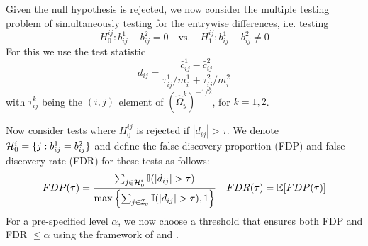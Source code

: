 \documentclass[12pt, letterpaper]{article}
\theoremstyle{definition}
\DeclareMathOperator*{\Th}{^{\text{th}}}
\numberwithin{equation}{section}
\begin{document}
Given the null hypothesis is rejected, we now consider the multiple testing problem of simultaneously testing for the entrywise differences, i.e. testing
%
$$
H_0^{ij}: b_{ij}^1 - b_{ij}^2 = 0 \quad \text{vs.} \quad H_1^{ij}: b_{ij}^1 - b_{ij}^2 \neq 0 
$$
%
For this we use the test statistic
%
$$
d_{ij} = \frac{\widehat c_{ij}^1 - \widehat c_{ij}^2}{\tau_{ij}^1/ m_i^1 + \tau_{ij}^2/ m_i^2}
$$
%
with $\tau_{ij}^k$ being the $(i,j)^{\Th}$ element of $( \widehat \Omega_y^k)^{-1/2}$, for $k = 1,2$.

Now consider tests where $H_0^{ij}$ is rejected if $| d_{ij} | > \tau$. We denote ${\cal{H}}_0^i = \{ j: b_{ij}^1 = b_{ij}^2 \}$ and define the false discovery proportion (FDP) and false discovery rate (FDR) for these tests as follows:
%
$$
FDP (\tau) = \frac{\sum_{j \in {\cal{H}}_0^i} {\mathbb{I}}( |d_{ij}| > \tau)}{\max\left\{
\sum_{j \in {\cal{I}}_q} {\mathbb{I}}( |d_{ij}| > \tau), 1\right\} }\quad
FDR (\tau) = {\mathbb{E}} [ FDP (\tau) ]
$$
%
For a pre-specified level $\alpha$, we now choose a threshold that ensures both FDP and FDR $\leq \alpha$ using the framework of \cite{Liu17} and \cite{Efron07}.
\appendix
\end{document}
